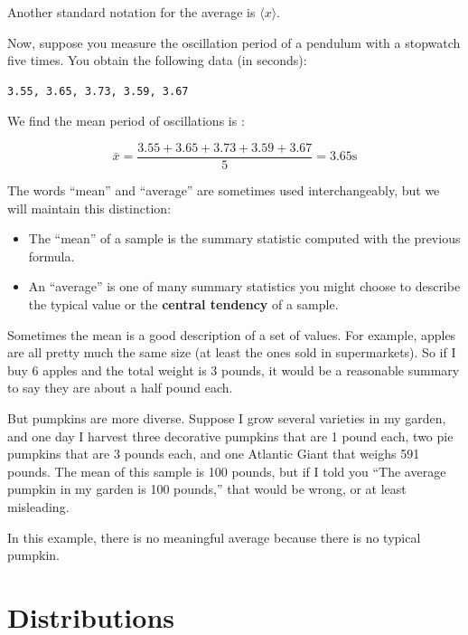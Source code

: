 Another standard notation for the average is $\langle x\rangle$.

Now, suppose you measure the oscillation period of a pendulum with a stopwatch five times. You obtain the following data (in seconds):
\begin{verbatim}
3.55, 3.65, 3.73, 3.59, 3.67
\end{verbatim}

We find the mean period of oscillations is :

\[ \bar{x} = \frac{3.55+ 3.65+ 3.73+3.59+3.67}{5} = 3.65 \text{s}\]

The words ``mean'' and ``average'' are sometimes used interchangeably,
but we will maintain this distinction:

\begin{itemize}

\item The ``mean'' of a sample is the summary statistic computed with
  the previous formula.

\item An ``average'' is one of many summary statistics you might
  choose to describe the typical value or the
  \textbf{central tendency} of a sample.

\end{itemize}

Sometimes the mean is a good description of a set of values.  For
example, apples are all pretty much the same size (at least the ones
sold in supermarkets).  So if I buy 6 apples and the total weight is 3
pounds, it would be a reasonable summary to say they are about a half
pound each.

But pumpkins are more diverse.  Suppose I grow several varieties in my
garden, and one day I harvest three decorative pumpkins that are 1
pound each, two pie pumpkins that are 3 pounds each, and one Atlantic
Giant that weighs 591 pounds.  The mean of
this sample is 100 pounds, but if I told you ``The average pumpkin
in my garden is 100 pounds,'' that would be wrong, or at least
misleading.

In this example, there is no meaningful average because
there is no typical pumpkin.



\section{Distributions}
\label{distributions}


